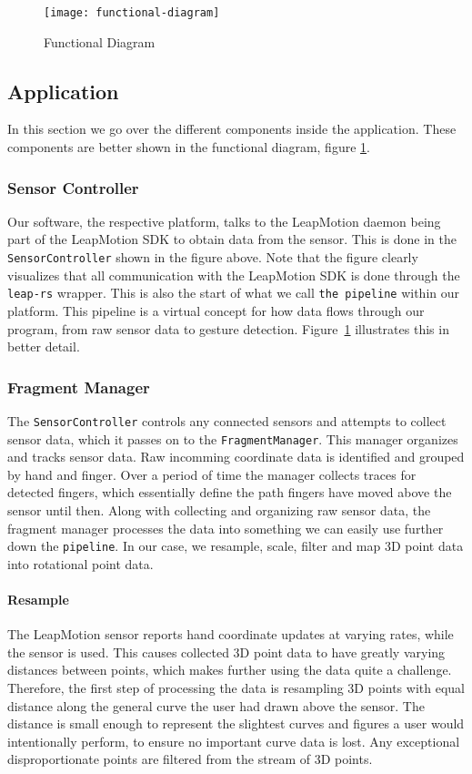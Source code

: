 \documentclass{standalone}
\begin{document}
  \begin{figure}[h]
    \centering
      \texttt{[image: functional-diagram]}
    \caption{Functional Diagram}
    \label{fig:pipeline-diagram}
  \end{figure}

  \subsection{Application}
  In this section we go over the different components inside the application.
  These components are better shown in the functional diagram,
  figure \ref{fig:pipeline-diagram}.

  \subsubsection{Sensor Controller}
  Our software, the respective platform, talks to the LeapMotion daemon being
  part of the LeapMotion SDK to obtain data from the sensor. This is done in the
  \verb_SensorController_ shown in the figure above. Note that the figure
  clearly visualizes that all communication with the LeapMotion SDK is done
  through the \verb_leap-rs_ wrapper. This is also the start of what we call
  \verb_the pipeline_ within our platform. This pipeline is a virtual concept
  for how data flows through our program, from raw sensor data to gesture
  detection.
  Figure~\ref{fig:pipeline-diagram} illustrates this in
  better detail.

  \subsubsection{Fragment Manager}
  The \verb_SensorController_ controls any connected sensors and attempts to
  collect sensor data, which it passes on to the \verb_FragmentManager_. This
  manager organizes and tracks sensor data. Raw incomming coordinate data is
  identified and grouped by hand and finger. Over a period of time the manager
  collects traces for detected fingers, which essentially define the path
  fingers have moved above the sensor until then. Along with collecting and
  organizing raw sensor data, the fragment manager processes the data into
  something we can easily use further down the \verb_pipeline_. In our case, we
  resample, scale, filter and map 3D point data into rotational point data.

  \paragraph{Resample}
  The LeapMotion sensor reports hand coordinate updates at varying rates, while
  the sensor is used. This causes collected 3D point data to have greatly
  varying distances between points, which makes further using the data quite a
  challenge. Therefore, the first step of processing the data is resampling 3D
  points with equal distance along the general curve the user had drawn above
  the sensor. The distance is small enough to represent the slightest curves and
  figures a user would intentionally perform, to ensure no important curve data
  is lost. Any exceptional disproportionate points are filtered from the stream
  of 3D points.
\end{document}
